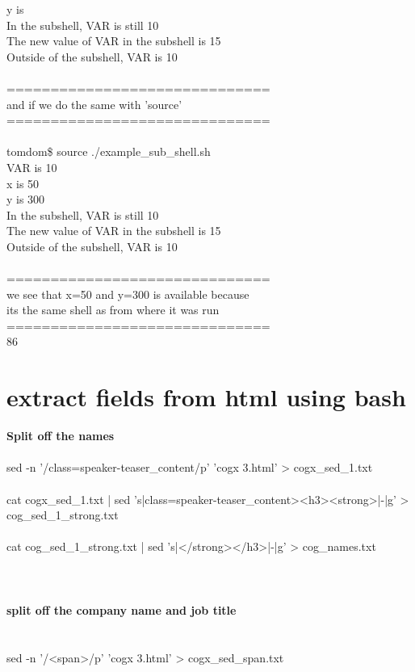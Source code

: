 \documentclass[10pt,a4paper]{article}
\begin{document}
{{{{{{{{{{{{{{y is \\
In the subshell, VAR is still 10\\
The new value of VAR in the subshell is 15\\
Outside of the subshell, VAR is 10\\
\\
==============================\\
and if we do the same with 'source'\\
==============================\\
\\
tomdom\$ source ./example\_sub\_shell.sh\\
VAR is 10\\
x is  50\\
y is  300\\
In the subshell, VAR is still 10\\
The new value of VAR in the subshell is 15\\
Outside of the subshell, VAR is 10\\
\\
==============================\\
we see that x=50 and y=300 is available because \\
its the same shell as from where it was run\\
==============================\\
}86
\hypertarget{extract_fields_from_html_using_bash}{\section {extract fields from html using bash}}
\textbf{Split off the names}\\
\\
sed -n '/class=speaker-teaser\_content/p' 'cogx 3.html' > cogx\_sed\_1.txt\\
\\
cat cogx\_sed\_1.txt | sed 's|class=speaker-teaser\_content><h3><strong>|-|g' > cog\_sed\_1\_strong.txt\\
\\
cat cog\_sed\_1\_strong.txt | sed 's|</strong></h3>|-|g' > cog\_names.txt\\
\\
\\
\\
\textbf{split off the company name and job title}\\
\\
\\
sed -n '/<span>/p' 'cogx 3.html' > cogx\_sed\_span.txt\\
}}}}}}}}}}}}}
\end{document}
